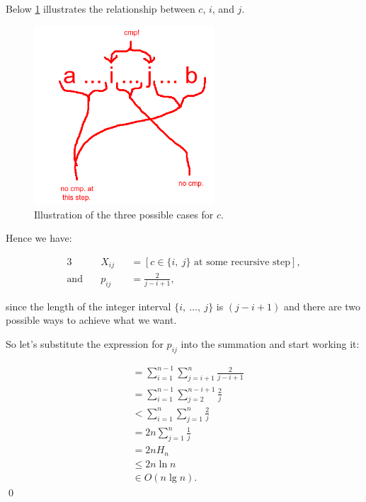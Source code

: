 \begin{enumerate}
    Below \cref{fig:randqs_lemma} illustrates the relationship between $c$, $i$,
    and $j$.

    \begin{figure}[H]
      \centering
      \includegraphics[width=0.6\textwidth]{figures/randqs_lemma.png}
      \caption{Illustration of the three possible cases for $c$.}
      \label{fig:randqs_lemma}
    \end{figure}

    Hence we have:

    \begin{textred}
      \begin{alignat}{3}
                        &X_{ij} &&= [c \in \{i,\ j\} \text{ at some recursive step}],\\
        \text{and}\quad &p_{ij} &&= \frac{2}{j - i + 1},
      \end{alignat}
    \end{textred}

    since the length of the integer interval $\{i,\ \dots,\ j\}$ is $(j - i +
    1)$ and there are two possible ways to achieve what we want.

    So let's substitute the expression for $p_{ij}$ into the summation and start
    working it:

    \begin{textred}
      \begin{align}
         &= \sum_{i = 1}^{n - 1}\sum_{j = i + 1}^n \frac{2}{j - i + 1}\\
         &= \sum_{i = 1}^{n - 1}\sum_{j = 2}^{n - i + 1} \frac{2}{j}\\
         &< \sum_{i = 1}^{n}\sum_{j = 1}^{n} \frac{2}{j}\\
         &= 2n\sum_{j = 1}^{n} \frac{1}{j}\\
         &= 2nH_n\\
         &\leq 2n\ln n\\
         &\in O(n \lg n).
      \end{align}
    \qed
    \end{textred}
\end{enumerate}

